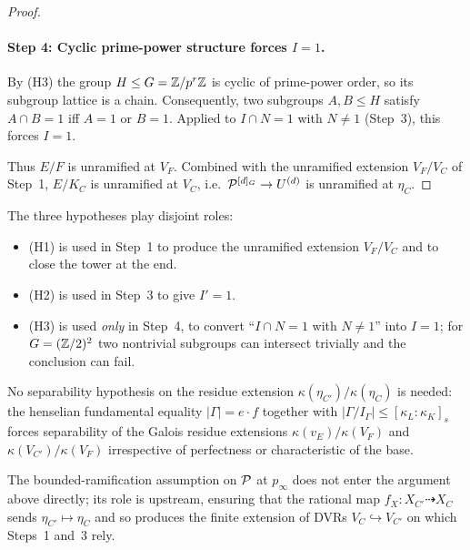 \documentclass[11pt]{article}
\begin{document}
\begin{proof}
\paragraph{Step 4: Cyclic prime-power structure forces $I = 1$.}
By (H3) the group $H \leq G = \mathbb{Z}/p^r\mathbb{Z}$ is cyclic of prime-power order, so
its subgroup lattice is a chain.  Consequently, two subgroups
$A, B \leq H$ satisfy $A \cap B = 1$ iff $A = 1$ or $B = 1$.  Applied to
$I \cap N = 1$ with $N \neq 1$ (Step~3), this forces $I = 1$.

Thus $E/F$ is unramified at $V_F$.  Combined with the unramified extension
$V_F/V_C$ of Step~1, $E/K_C$ is unramified at $V_C$, i.e.\
$\mathcal{P}^{[d]_G} \to U^{(d)}$ is unramified at $\eta_C$.
\end{proof}

\begin{rem*}\label{rem:where-each-hypothesis-bites}
The three hypotheses play disjoint roles:
\begin{itemize}
  \item (H1) is used in Step~1 to produce the unramified extension
        $V_F/V_C$ and to close the tower at the end.
  \item (H2) is used in Step~3 to give $I' = 1$.
  \item (H3) is used \emph{only} in Step~4, to convert
        ``$I \cap N = 1$ with $N \neq 1$'' into $I = 1$; for
        $G = (\mathbb{Z}/2)^2$ two nontrivial subgroups can intersect trivially
        and the conclusion can fail.
\end{itemize}
No separability hypothesis on the residue extension
$\kappa(\eta_{C'})/\kappa(\eta_C)$ is needed: the henselian fundamental
equality $|\Gamma| = e \cdot f$ together with
$|\Gamma/I_\Gamma| \leq [\kappa_L : \kappa_K]_s$ forces separability of the
Galois residue extensions $\kappa(v_E)/\kappa(V_F)$ and
$\kappa(V_{C'})/\kappa(V_F)$ irrespective of perfectness or characteristic
of the base.

The bounded-ramification assumption on $\mathcal{P}$ at $p_\infty$ does not enter
the argument above directly; its role is upstream, ensuring that the
rational map $f_X \colon X_{C'} \dashrightarrow X_C$ sends
$\eta_{C'} \mapsto \eta_C$ and so produces the finite extension of DVRs
$V_C \hookrightarrow V_{C'}$ on which Steps~1 and~3 rely.
\end{rem*}


\printbibliography
\end{document}
